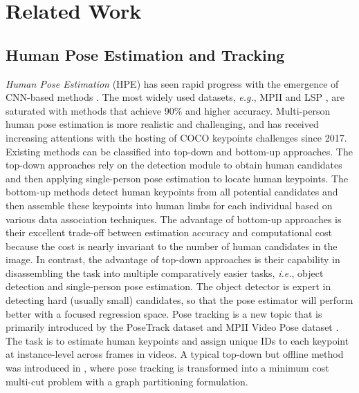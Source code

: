 \documentclass[10pt,twocolumn,letterpaper]{article}
\begin{document}
	
	
\section{Related Work}
	\subsection{Human Pose Estimation and Tracking} 
	
	\textit{Human Pose Estimation} (HPE) has seen rapid progress with the emergence of CNN-based methods \cite{wei2016convolutional, newell2016stacked, yang2017learning, ke2018multi}. 
The most widely used datasets, \emph{e.g.}, MPII \cite{andriluka14cvpr} and LSP \cite{Johnson10}, are saturated with methods that achieve 90\% and higher accuracy.
	Multi-person human pose estimation is more realistic and challenging, and has received increasing attentions with the hosting of COCO keypoints challenges \cite{lin2014microsoft} since 2017. Existing methods can be classified into top-down and bottom-up approaches. The top-down approaches \cite{fang2017rmpe,papandreou2017towards,he2017mask} rely on the detection module to obtain human candidates and then applying single-person pose estimation to locate human keypoints. The bottom-up methods  \cite{cao2016realtime, xia2017joint, newell2016associative}
detect human keypoints from all potential candidates and then assemble these keypoints into human limbs for each individual based on various data association techniques. 
	The advantage of bottom-up approaches is their excellent trade-off between estimation accuracy and computational cost because the cost is nearly invariant to the number of human candidates in the image. 
	In contrast, the advantage of top-down approaches is their capability in disassembling the task into multiple comparatively easier tasks, \emph{i.e.}, object detection and single-person pose estimation. The object detector is expert in detecting hard (usually small) candidates, so that the pose estimator will perform better with a focused regression space.
	Pose tracking is a new topic that is primarily introduced by the PoseTrack dataset \cite{iqbal2017posetrack, andriluka2018posetrack} and MPII Video Pose dataset \cite{insafutdinov2017arttrack}. 
The task is to estimate human keypoints and assign unique IDs to each keypoint at instance-level across frames in videos. 
A typical top-down but offline method was introduced in \cite{insafutdinov2017arttrack}, where pose tracking is transformed into a minimum cost multi-cut problem with a graph partitioning formulation.
	
\end{document}
